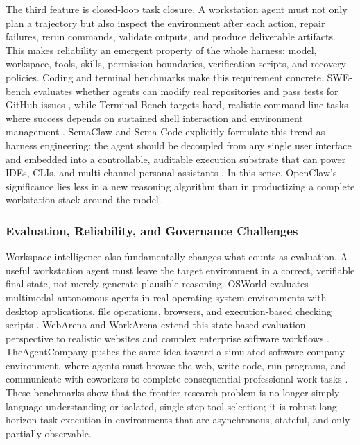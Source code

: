 The third feature is closed-loop task closure.
A workstation agent must not only plan a trajectory but also inspect the environment after each action, repair failures, rerun commands, validate outputs, and produce deliverable artifacts.
This makes reliability an emergent property of the whole harness: model, workspace, tools, skills, permission boundaries, verification scripts, and recovery policies.
Coding and terminal benchmarks make this requirement concrete.
SWE-bench evaluates whether agents can modify real repositories and pass tests for GitHub issues \cite{jimenez2023swebench}, while Terminal-Bench targets hard, realistic command-line tasks where success depends on sustained shell interaction and environment management \cite{merrill2026terminalbench}.
SemaClaw and Sema Code explicitly formulate this trend as harness engineering: the agent should be decoupled from any single user interface and embedded into a controllable, auditable execution substrate that can power IDEs, CLIs, and multi-channel personal assistants \cite{zhu2026semaclaw,wang2026semacode}.
In this sense, OpenClaw's significance lies less in a new reasoning algorithm than in productizing a complete workstation stack around the model.

\subsubsection{Evaluation, Reliability, and Governance Challenges}

Workspace intelligence also fundamentally changes what counts as evaluation. A useful workstation agent must leave the target environment in a correct, verifiable final state, not merely generate plausible reasoning. OSWorld evaluates multimodal autonomous agents in real operating-system environments with desktop applications, file operations, browsers, and execution-based checking scripts \cite{xie2024osworld}. WebArena and WorkArena extend this state-based evaluation perspective to realistic websites and complex enterprise software workflows \cite{zhou2023webarena,drouin2024workarena}. TheAgentCompany pushes the same idea toward a simulated software company environment, where agents must browse the web, write code, run programs, and communicate with coworkers to complete consequential professional work tasks \cite{theagentcompany2024}. These benchmarks show that the frontier research problem is no longer simply language understanding or isolated, single-step tool selection; it is robust long-horizon task execution in environments that are asynchronous, stateful, and only partially observable.


